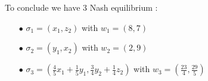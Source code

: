 To conclude we have 3 Nash equilibrium :
\begin{itemize}
  \item[$\bullet$]  $\sigma_1 = \left(x_1,z_2\right)$ with $w_1= \left(8,7\right)$
  \item[$\bullet$]  $\sigma_2 = \left(y_1,x_2\right)$ with $w_2= \left(2,9\right)$
  \item[$\bullet$]  $\sigma_3 = \left( \frac{4}{5}x_1 + \frac{1}{5}y_1, \frac{3}{4}y_2 + \frac{1}{4}z_2\right)$ with $w_3= \left(\frac{23}{4},\frac{29}{5}\right)$
\end{itemize}


